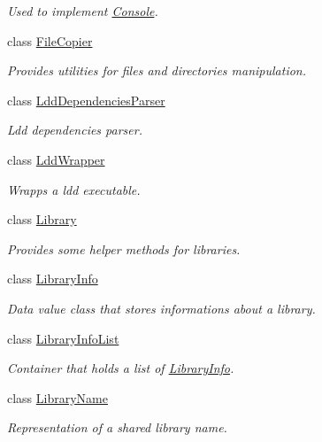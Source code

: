 \begin{DoxyCompactItemize}
\begin{DoxyCompactList}\small\item\em Used to implement \hyperlink{class_mdt_1_1_deploy_utils_1_1_console}{Console}. \end{DoxyCompactList}\item 
class \hyperlink{class_mdt_1_1_deploy_utils_1_1_file_copier}{File\+Copier}
\begin{DoxyCompactList}\small\item\em Provides utilities for files and directories manipulation. \end{DoxyCompactList}\item 
class \hyperlink{class_mdt_1_1_deploy_utils_1_1_ldd_dependencies_parser}{Ldd\+Dependencies\+Parser}
\begin{DoxyCompactList}\small\item\em Ldd dependencies parser. \end{DoxyCompactList}\item 
class \hyperlink{class_mdt_1_1_deploy_utils_1_1_ldd_wrapper}{Ldd\+Wrapper}
\begin{DoxyCompactList}\small\item\em Wrapps a ldd executable. \end{DoxyCompactList}\item 
class \hyperlink{class_mdt_1_1_deploy_utils_1_1_library}{Library}
\begin{DoxyCompactList}\small\item\em Provides some helper methods for libraries. \end{DoxyCompactList}\item 
class \hyperlink{class_mdt_1_1_deploy_utils_1_1_library_info}{Library\+Info}
\begin{DoxyCompactList}\small\item\em Data value class that stores informations about a library. \end{DoxyCompactList}\item 
class \hyperlink{class_mdt_1_1_deploy_utils_1_1_library_info_list}{Library\+Info\+List}
\begin{DoxyCompactList}\small\item\em Container that holds a list of \hyperlink{class_mdt_1_1_deploy_utils_1_1_library_info}{Library\+Info}. \end{DoxyCompactList}\item 
class \hyperlink{class_mdt_1_1_deploy_utils_1_1_library_name}{Library\+Name}
\begin{DoxyCompactList}\small\item\em Representation of a shared library name. \end{DoxyCompactList}\item 

\end{DoxyCompactItemize}
